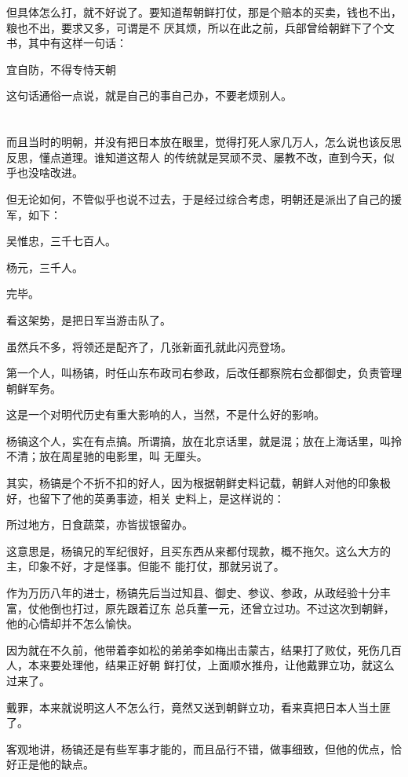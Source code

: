 \documentclass[11pt,a4paper,onecolumn]{article}
\begin{document}
但具体怎么打，就不好说了。要知道帮朝鲜打仗，那是个赔本的买卖，钱也不出，粮也不出，要求又多，可谓是不
厌其烦，所以在此之前，兵部曾给朝鲜下了个文书，其中有这样一句话：

宜自防，不得专恃天朝

这句话通俗一点说，就是自己的事自己办，不要老烦别人。

\section[\thesection]{}

而且当时的明朝，并没有把日本放在眼里，觉得打死人家几万人，怎么说也该反思反思，懂点道理。谁知道这帮人
的传统就是冥顽不灵、屡教不改，直到今天，似乎也没啥改进。

但无论如何，不管似乎也说不过去，于是经过综合考虑，明朝还是派出了自己的援军，如下：

吴惟忠，三千七百人。

杨元，三千人。

完毕。

看这架势，是把日军当游击队了。

虽然兵不多，将领还是配齐了，几张新面孔就此闪亮登场。

第一个人，叫杨镐，时任山东布政司右参政，后改任都察院右佥都御史，负责管理朝鲜军务。

这是一个对明代历史有重大影响的人，当然，不是什么好的影响。

杨镐这个人，实在有点搞。所谓搞，放在北京话里，就是混；放在上海话里，叫拎不清；放在周星驰的电影里，叫
无厘头。

其实，杨镐是个不折不扣的好人，因为根据朝鲜史料记载，朝鲜人对他的印象极好，也留下了他的英勇事迹，相关
史料上，是这样说的：

所过地方，日食蔬菜，亦皆拔银留办。

这意思是，杨镐兄的军纪很好，且买东西从来都付现款，概不拖欠。这么大方的主，印象不好，才是怪事。但能不
能打仗，那就另说了。

作为万历八年的进士，杨镐先后当过知县、御史、参议、参政，从政经验十分丰富，仗他倒也打过，原先跟着辽东
总兵董一元，还曾立过功。不过这次到朝鲜，他的心情却并不怎么愉快。

因为就在不久前，他带着李如松的弟弟李如梅出击蒙古，结果打了败仗，死伤几百人，本来要处理他，结果正好朝
鲜打仗，上面顺水推舟，让他戴罪立功，就这么过来了。

戴罪，本来就说明这人不怎么行，竟然又送到朝鲜立功，看来真把日本人当土匪了。

客观地讲，杨镐还是有些军事才能的，而且品行不错，做事细致，但他的优点，恰好正是他的缺点。
\end{document}
